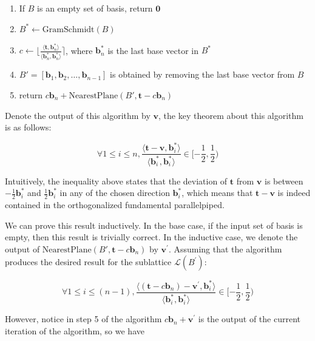 \begin{enumerate}
    \item If $B$ is an empty set of basis, return $\mathbf{0}$
    \item $B^\ast \leftarrow \text{GramSchmidt}(B)$
    \item $c \leftarrow \lfloor \frac{\langle\mathbf{t}, \mathbf{b}_n^\ast\rangle}{\langle\mathbf{b}_n^\ast, \mathbf{b}_n^\ast\rangle} \rceil$, where $\mathbf{b}_n^\ast$ is the last base vector in $B^\ast$
    \item $B' = [\mathbf{b}_1, \mathbf{b}_2, \ldots, \mathbf{b}_{n-1}]$ is obtained by removing the last base vector from $B$
    \item return $c\mathbf{b}_n + \text{NearestPlane}(B', \mathbf{t} - c\mathbf{b}_n)$
\end{enumerate}



Denote the output of this algorithm by $\mathbf{v}$, the key theorem about this algorithm is as follows:

$$
\forall 1 \leq i \leq n, 
\frac{
    \langle
        \mathbf{t} - \mathbf{v}, \mathbf{b}_i^\ast
    \rangle
}{
    \langle
        \mathbf{b}_i^\ast, \mathbf{b}_i^\ast
    \rangle
} 
\in [-\frac{1}{2}, \frac{1}{2})
$$

Intuitively, the inequality above states that the deviation of $\mathbf{t}$ from $\mathbf{v}$ is between $-\frac{1}{2}\mathbf{b}_i^\ast$ and $\frac{1}{2}\mathbf{b}_i^\ast$ in any of the chosen direction $\mathbf{b}_i^\ast$, which means that $\mathbf{t} - \mathbf{v}$ is indeed contained in the orthogonalized fundamental parallelpiped.

We can prove this result inductively. In the base case, if the input set of basis is empty, then this result is trivially correct. In the inductive case, we denote the output of $\text{NearestPlane}(B', \mathbf{t} - c\mathbf{b}_n)$ by $\mathbf{v}^\prime$. Assuming that the algorithm produces the desired result for the sublattice $\mathcal{L}(B^\prime)$:

$$
\forall 1 \leq i \leq (n-1), 
\frac{
    \langle
        (\mathbf{t} - c\mathbf{b}_n) - \mathbf{v}^\prime, 
        \mathbf{b}_i^\ast
    \rangle
}{
    \langle
        \mathbf{b}_i^\ast, \mathbf{b}_i^\ast
    \rangle
} \in [-\frac{1}{2}, \frac{1}{2})
$$

However, notice in step 5 of the algorithm $c\mathbf{b}_n + \mathbf{v}^\prime$ is the output of the current iteration of the algorithm, so we have

